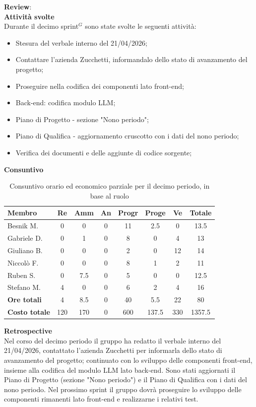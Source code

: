\documentclass[a4paper,10pt]{article}
\begin{document}
\textbf{Review}: \\
\textbf{Attività svolte}\\
Durante il decimo sprint$^G$ sono state svolte le seguenti attività:
\begin{itemize}
  \item Stesura del verbale interno del 21/04/2026;
  \item Contattare l'azienda Zucchetti, informandalo dello stato di avanzamento del progetto;
  \item Proseguire nella codifica dei componenti lato front-end;
  \item Back-end: codifica modulo LLM;
  \item Piano di Progetto - sezione "Nono periodo";
  \item Piano di Qualifica - aggiornamento cruscotto con i dati del nono periodo;
  \item Verifica dei documenti e delle aggiunte di codice sorgente;
\end{itemize}
\textbf{Consuntivo}
\begin{table}[H]
\centering
\begin{tabular}{|l|c|c|c|c|c|c|c|}
\hline
\textbf{Membro} & \textbf{Re} & \textbf{Amm} & \textbf{An} & \textbf{Progr} & \textbf{Proge} & \textbf{Ve} & \textbf{Totale} \\
\hline
Besnik M.   & 0   & 0   & 0 & 11   & 2.5 & 0 & 13.5 \\
Gabriele D. & 0   & 1   & 0 & 8   & 0 & 4  & 13 \\
Giuliano B. & 0   & 0   & 0 & 2   & 0 & 12  & 14 \\
Niccolò F.  & 0   & 0   & 0 & 8   & 1 & 2  & 11 \\
Ruben S.    & 0 & 7.5   & 0 & 5   & 0 & 0  & 12.5 \\
Stefano M.  & 4   & 0   & 0 & 6   & 2 & 4  & 16 \\
\hline
\textbf{Ore totali} & 4  & 8.5 & 0 & 40  & 5.5 & 22 & 80 \\
\hline
\textbf{Costo totale} & 120 & 170 & 0 & 600  & 137.5  & 330 & 1357.5 \\
\hline
\end{tabular}
\caption{Consuntivo orario ed economico parziale per il decimo periodo, in base al ruolo}
\end{table}

\textbf{Retrospective} \\
Nel corso del decimo periodo il gruppo ha redatto il verbale interno del 21/04/2026, contattato l'azienda Zucchetti per informarla dello stato di avanzamento del progetto; continuato con lo sviluppo delle componenti front-end, insieme alla codifica del modulo LLM lato back-end. Sono stati aggiornati il Piano di Progetto (sezione "Nono periodo") e il Piano di Qualifica con i dati del nono periodo.
Nel prossimo sprint il gruppo dovrà proseguire lo sviluppo delle componenti rimanenti lato front-end e realizzarne i relativi test.
\end{document}
